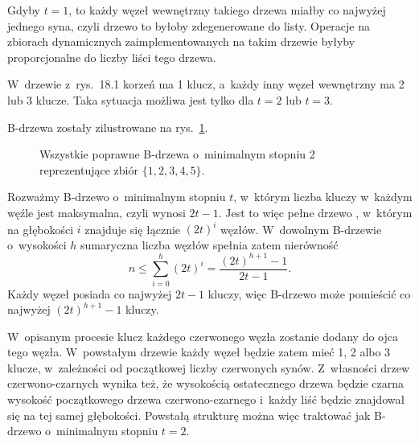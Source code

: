 
\exercise %
Gdyby $t=1$, to każdy węzeł wewnętrzny takiego drzewa miałby co najwyżej jednego syna, czyli drzewo to byłoby zdegenerowane do listy.
Operacje na zbiorach dynamicznych zaimplementowanych na takim drzewie byłyby proporcjonalne do liczby liści tego drzewa.

\exercise %
W~drzewie z~rys.\ 18.1 korzeń ma 1 klucz, a~każdy inny węzeł wewnętrzny ma 2 lub 3 klucze.
Taka sytuacja możliwa jest tylko dla $t=2$ lub $t=3$.

\exercise %
B-drzewa zostały zilustrowane na rys.\ \ref{fig:18.1-3}.
\begin{figure}[!ht]
	\centering 
	\caption{Wszystkie poprawne B-drzewa o~minimalnym stopniu 2 reprezentujące zbiór $\{1,2,3,4,5\}$.} \label{fig:18.1-3}
\end{figure}

\exercise %
Rozważmy B-drzewo o~minimalnym stopniu $t$, w~którym liczba kluczy w~każdym węźle jest maksymalna, czyli wynosi $2t-1$.
Jest to więc pełne drzewo , w~którym na głębokości $i$ znajduje się łącznie $(2t)^i$ węzłów.
W~dowolnym B-drzewie o~wysokości $h$ sumaryczna liczba węzłów spełnia zatem nierówność
\[
	n \le \sum_{i=0}^h(2t)^i = \frac{(2t)^{h+1}-1}{2t-1}.
\]
Każdy węzeł posiada co najwyżej $2t-1$ kluczy, więc B-drzewo może pomieścić co najwyżej $(2t)^{h+1}-1$ kluczy.

\exercise %
W~opisanym procesie klucz każdego czerwonego węzła zostanie dodany do ojca tego węzła.
W~powstałym drzewie każdy węzeł będzie zatem mieć 1, 2 albo 3 klucze, w~zależności od początkowej liczby czerwonych synów.
Z~własności drzew czerwono-czarnych wynika też, że wysokością ostatecznego drzewa będzie czarna wysokość początkowego drzewa czerwono-czarnego i~każdy liść będzie znajdował się na tej samej głębokości.
Powstałą strukturę można więc traktować jak B-drzewo o~minimalnym stopniu $t=2$.
